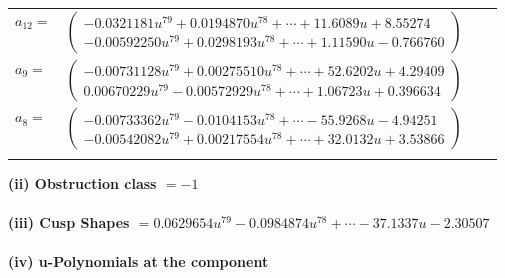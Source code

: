 \documentclass[1p]{elsarticle_modified}
\theoremstyle{definition}
\begin{document}
\begin{tabular}{m{7pt} m{180pt} m{7pt} m{180pt} }
\flushright $a_{12}=$&$\begin{pmatrix}-0.0321181 u^{79}+0.0194870 u^{78}+\cdots+11.6089 u+8.55274\\-0.00592250 u^{79}+0.0298193 u^{78}+\cdots+1.11590 u-0.766760\end{pmatrix}$ \\
\flushright $a_{9}=$&$\begin{pmatrix}-0.00731128 u^{79}+0.00275510 u^{78}+\cdots+52.6202 u+4.29409\\0.00670229 u^{79}-0.00572929 u^{78}+\cdots+1.06723 u+0.396634\end{pmatrix}$ \\
\flushright $a_{8}=$&$\begin{pmatrix}-0.00733362 u^{79}-0.0104153 u^{78}+\cdots-55.9268 u-4.94251\\-0.00542082 u^{79}+0.00217554 u^{78}+\cdots+32.0132 u+3.53866\end{pmatrix}$\\&\end{tabular}
\flushleft \textbf{(ii) Obstruction class $= -1$}\\~\\
\flushleft \textbf{(iii) Cusp Shapes $= 0.0629654 u^{79}-0.0984874 u^{78}+\cdots-37.1337 u-2.30507$}\\~\\
\newpage\renewcommand{\arraystretch}{1}
\flushleft \textbf{(iv) u-Polynomials at the component}\newline \\
\end{document}
